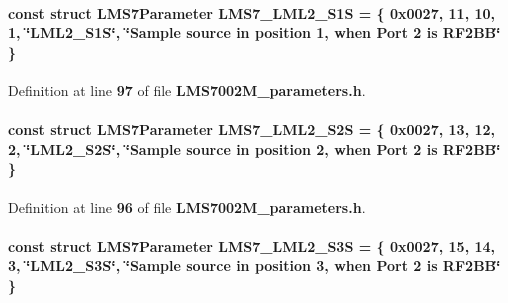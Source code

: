\paragraph[{L\+M\+S7\+\_\+\+L\+M\+L2\+\_\+\+S1S}]{\setlength{\rightskip}{0pt plus 5cm}const struct {\bf L\+M\+S7\+Parameter} L\+M\+S7\+\_\+\+L\+M\+L2\+\_\+\+S1S = \{ 0x0027, 11, 10, 1, \char`\"{}\+L\+M\+L2\+\_\+\+S1\+S\char`\"{}, \char`\"{}\+Sample source in position 1, when Port 2 is R\+F2\+B\+B\char`\"{} \}\hspace{0.3cm}{\ttfamily [static]}}\label{LMS7002M__parameters_8h_a3af9b5d72cda6a0b21a13464d4333c87}


Definition at line {\bf 97} of file {\bf L\+M\+S7002\+M\+\_\+parameters.\+h}.

\paragraph[{L\+M\+S7\+\_\+\+L\+M\+L2\+\_\+\+S2S}]{\setlength{\rightskip}{0pt plus 5cm}const struct {\bf L\+M\+S7\+Parameter} L\+M\+S7\+\_\+\+L\+M\+L2\+\_\+\+S2S = \{ 0x0027, 13, 12, 2, \char`\"{}\+L\+M\+L2\+\_\+\+S2\+S\char`\"{}, \char`\"{}\+Sample source in position 2, when Port 2 is R\+F2\+B\+B\char`\"{} \}\hspace{0.3cm}{\ttfamily [static]}}\label{LMS7002M__parameters_8h_a27dd4bef14aede03821b9cb65b16e87e}


Definition at line {\bf 96} of file {\bf L\+M\+S7002\+M\+\_\+parameters.\+h}.

\paragraph[{L\+M\+S7\+\_\+\+L\+M\+L2\+\_\+\+S3S}]{\setlength{\rightskip}{0pt plus 5cm}const struct {\bf L\+M\+S7\+Parameter} L\+M\+S7\+\_\+\+L\+M\+L2\+\_\+\+S3S = \{ 0x0027, 15, 14, 3, \char`\"{}\+L\+M\+L2\+\_\+\+S3\+S\char`\"{}, \char`\"{}\+Sample source in position 3, when Port 2 is R\+F2\+B\+B\char`\"{} \}\hspace{0.3cm}{\ttfamily [static]}}\label{LMS7002M__parameters_8h_a40830237682eef934192a67e97ba860a}


